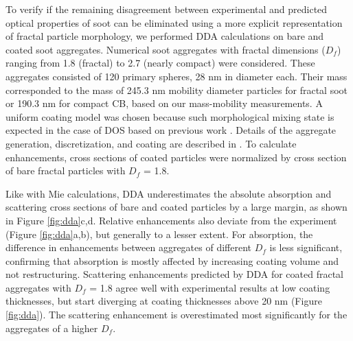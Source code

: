\documentclass[12pt,authoryear]{elsarticle}
\begin{document}
To verify if the remaining disagreement between experimental and predicted optical properties of soot can be eliminated using a more explicit representation of fractal particle morphology, we performed DDA calculations on bare and coated soot aggregates. Numerical soot aggregates with fractal dimensions ($D_f$) ranging from 1.8 (fractal) to 2.7 (nearly compact) were considered. These aggregates consisted of 120 primary spheres, 28 nm in diameter each. Their mass corresponded to the mass of 245.3 nm mobility diameter particles for fractal soot or 190.3 nm for compact CB, based on our mass-mobility measurements. A uniform coating model was chosen because such morphological mixing state is expected in the case of DOS based on previous work \citep{RN70}. Details of the aggregate generation, discretization, and coating are described in \citet{RN22}. To calculate enhancements, cross sections of coated particles were normalized by cross section of bare fractal particles with $D_f$ = 1.8.

Like with Mie calculations, DDA underestimates the absolute absorption and scattering cross sections of bare and coated particles by a large margin, as shown in Figure \ref{fig:dda}c,d. Relative enhancements also deviate from the experiment (Figure \ref{fig:dda}a,b), but generally to a lesser extent. For absorption, the difference in enhancements between aggregates of different $D_f$ is less significant, confirming that absorption is mostly affected by increasing coating volume and not restructuring. Scattering enhancements predicted by DDA for coated fractal aggregates with $D_f$ = 1.8 agree well with experimental results at low coating thicknesses, but start diverging at coating thicknesses above 20 nm (Figure \ref{fig:dda}). The scattering enhancement is overestimated most significantly for the aggregates of a higher $D_f$.
\end{document}

